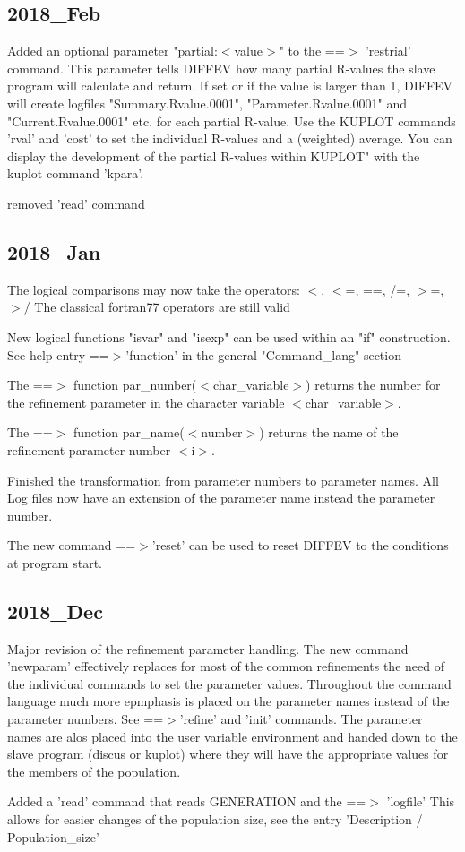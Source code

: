 \subsection*{2018\_Feb}
\par
Added an optional parameter "partial:$ <$value$> $" to the 
==$> $ 'restrial' command. This parameter tells DIFFEV how many 
partial R-values the slave program will calculate and return. 
If set or if the value is larger than 1, DIFFEV will create 
logfiles "Summary.Rvalue.0001", "Parameter.Rvalue.0001" and 
"Current.Rvalue.0001" etc. for each partial R-value. 
Use the KUPLOT commands 'rval' and 'cost' to set the 
individual R-values and a (weighted) average. 
You can display the development of the partial R-values within 
KUPLOT" with the kuplot command 'kpara'. 
\par
removed 'read' command 
\subsection*{2018\_Jan}
\par
The logical comparisons may now take the operators: 
$ <$, $ <$=, ==, /=, $> $=, $> $/ 
The classical fortran77 operators are still valid 
\par
New logical functions "isvar" and "isexp" can be used within an 
"if" construction. See help entry ==$> $'function' in the 
general "Command\_lang" section 
\par
The ==$> $ function par\_number($ <$char\_variable$> $) returns the 
number for the refinement parameter in the character variable 
$ <$char\_variable$> $. 
\par
The ==$> $ function par\_name($ <$number$> $) returns the name of the 
refinement parameter number $ <$i$> $. 
\par
Finished the transformation from parameter numbers to 
parameter names. All Log files now have an extension of the 
parameter name instead the parameter number. 
\par
The new command ==$> $'reset' can be used to reset DIFFEV to the 
conditions at program start. 
\subsection*{2018\_Dec}
\par
Major revision of the refinement parameter handling. 
The new command 'newparam' effectively replaces for most of the 
common refinements the need of the individual commands to set the 
parameter values. Throughout the command language much more 
epmphasis is placed on the parameter names instead of the 
parameter numbers. See ==$> $'refine' and 'init' commands. 
The parameter names are alos placed into the user variable 
environment and handed down to the slave program (discus or kuplot) 
where they will have the appropriate values for the members of 
the population. 
\par
Added a 'read' command that reads GENERATION and the ==$> $ 'logfile' 
This allows for easier changes of the population size, see the 
entry 'Description / Population\_size' 
